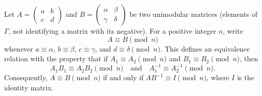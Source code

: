 Let $A = \begin{pmatrix} a & b \\ c & d \end{pmatrix}$ and $B = \begin{pmatrix} \alpha & \beta \\ \gamma & \delta \end{pmatrix}$ be two unimodular matrices (elements of $\Gamma$, not identifying a matrix with its negative). For a positive integer $n$, write
$$A \equiv B \pmod{n}$$
whenever $a \equiv \alpha$, $b \equiv \beta$, $c \equiv \gamma$, and $d \equiv \delta \pmod{n}$. This defines an equivalence relation with the property that if $A_1 \equiv A_2 \pmod{n}$ and $B_1 \equiv B_2 \pmod{n}$, then
$$A_1B_1 \equiv A_2B_2 \pmod{n} \quad\text{and}\quad A_1^{-1} \equiv A_2^{-1} \pmod{n}.$$
Consequently, $A \equiv B \pmod{n}$ if and only if $AB^{-1} \equiv I \pmod{n}$, where $I$ is the identity matrix.
